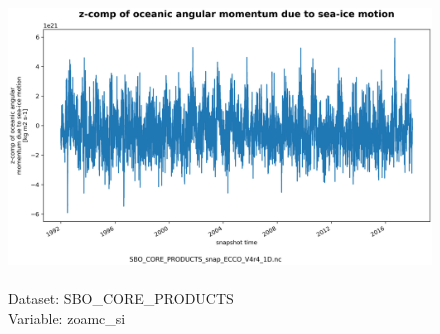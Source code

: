 \begin{figure}[H]
\centering
\includegraphics[scale=0.5]{../images/plots/oneD_plots/SBO_Core_Products/zoamc_si.png}
\caption{\\Dataset: SBO\_CORE\_PRODUCTS\\Variable: zoamc\_si}
\label{tab:table-SBO_CORE_PRODUCTS_zoamc_si-Plot}
\end{figure}
\pagebreak
